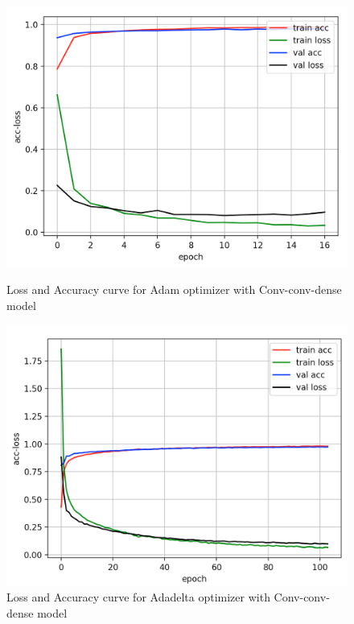 \documentclass{article}
\begin{document}
\begin{figure}[htbp]
\centering
\begin{minipage}[t]{0.48\textwidth}
\centering
\includegraphics[scale = 0.3]{adam_3.png}
\caption{Loss and Accuracy curve for Adam optimizer with Conv-conv-dense model}
\end{minipage}
\begin{minipage}[t]{0.48\textwidth}
\centering
\includegraphics[scale = 0.3]{adadelta_3.png}
\caption{Loss and Accuracy curve for Adadelta optimizer with Conv-conv-dense model}
\end{minipage}
\end{figure}
\end{document}
